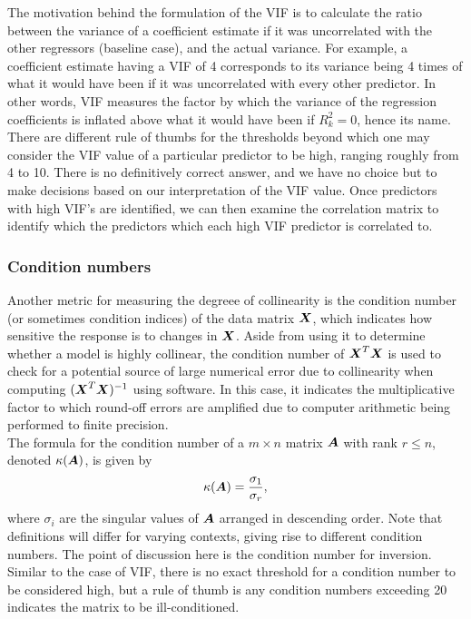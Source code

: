 \documentclass[12pt]{article}
\begin{document}
	The motivation behind the formulation of the VIF is to calculate the ratio between the variance of a coefficient estimate if it was uncorrelated with the other regressors (baseline case), and the actual variance. For example, a coefficient estimate having a VIF of 4 corresponds to its variance being 4 times of what it would have been if it was uncorrelated with every other predictor. In other words, VIF measures the factor by which the variance of the regression coefficients is inflated above what it would have been if $R_k^2=0$, hence its name. \\
	
	There are different rule of thumbs for the thresholds beyond which one may consider the VIF value of a particular predictor to be high, ranging roughly from 4 to 10. There is no definitively correct answer, and we have no choice but to make decisions based on our interpretation of the VIF value. Once predictors with high VIF's are identified, we can then examine the correlation matrix to identify which the predictors which each high VIF predictor is correlated to.
	
	\subsubsection{Condition numbers}
	Another metric for measuring the degreee of collinearity is the condition number (or sometimes condition indices) of the data matrix $\boldsymbol{X}$, which indicates how sensitive the response is to changes in $\boldsymbol{X}$. Aside from using it to determine whether a model is highly collinear, the condition number of $\boldsymbol{X}^T\boldsymbol{X}$ is used to check for a potential source of large numerical error due to collinearity when computing $(\boldsymbol{X}^T\boldsymbol{X})^{-1}$ using software. In this case, it indicates the multiplicative factor to which round-off errors are amplified due to computer arithmetic being performed to finite precision.\\
	
	The formula for the condition number of a $m\times n$ matrix $\boldsymbol{A}$ with rank $r\leq n$, denoted $\kappa(\boldsymbol{A})$, is given by
	$$\kappa(\boldsymbol{A})=\frac{\sigma_1}{\sigma_r},$$
	where $\sigma_i$ are the singular values of $\boldsymbol{A}$ arranged in descending order. Note that definitions will differ for varying contexts, giving rise to different condition numbers. The point of discussion here is the condition number for inversion.\\
	
	Similar to the case of VIF, there is no exact threshold for a condition number to be considered high, but a rule of thumb is any condition numbers exceeding 20 indicates the matrix to be ill-conditioned. 
	
\end{document}
